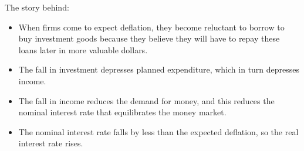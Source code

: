 \documentclass[10pt]{article}
\begin{document}
The story behind:
\begin{itemize}
\item When firms come to expect deflation, they become reluctant to borrow to buy investment goods because they believe they will have to repay these loans later in more valuable dollars.
\item The fall in investment depresses planned expenditure, which in turn depresses income.
\item The fall in income reduces the demand for money, and this reduces the nominal interest rate that equilibrates the money market.
\item The nominal interest rate falls by less than the expected deflation, so the real interest rate rises.


\end{itemize}
















\end{document}
